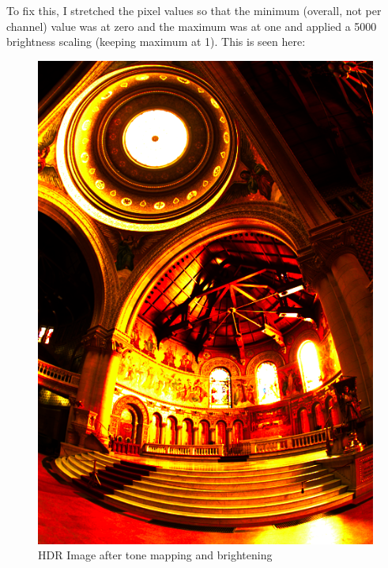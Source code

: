 \documentclass[a4paper,12pt,oneside,final]{report}
\newenvironment{changemargin}[2]{\begin{list}{}{%
\setlength{\topsep}{0pt}%
\setlength{\leftmargin}{0pt}%
\setlength{\rightmargin}{0pt}%
\setlength{\listparindent}{\parindent}%
\setlength{\itemindent}{\parindent}%
\setlength{\parsep}{0pt plus 1pt}%
\addtolength{\leftmargin}{#1}%
\addtolength{\rightmargin}{#2}%
}\item }{\end{list}}
\begin{document}
To fix this, I stretched the pixel values so that the minimum (overall, not per channel) value was at zero and the maximum was at one and applied a 5000 brightness scaling (keeping maximum at 1).  This is seen here:
\begin{figure}[!h]
\begin{changemargin}{-50mm}{-50mm}
\center
\includegraphics[scale=0.35]{memorial_hdr_stretched.png}
\caption{HDR Image after tone mapping and brightening}
\end{changemargin}
\end{figure}
\end{document}

